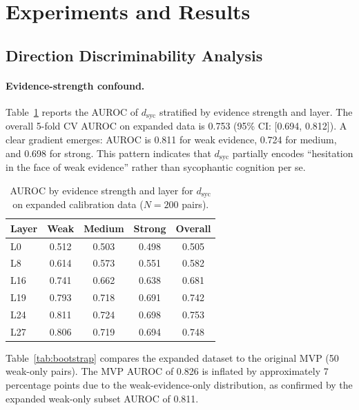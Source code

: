 \documentclass[11pt,a4paper]{article}
\begin{document}
\section{Experiments and Results}

\subsection{Direction Discriminability Analysis}
\label{sec:direction}

\paragraph{Evidence-strength confound.}
Table~\ref{tab:auroc_layer} reports the AUROC of $d_{\mathrm{syc}}$ stratified by evidence strength and layer. The overall 5-fold CV AUROC on expanded data is 0.753 (95\% CI: [0.694, 0.812]). A clear gradient emerges: AUROC is 0.811 for weak evidence, 0.724 for medium, and 0.698 for strong. This pattern indicates that $d_{\mathrm{syc}}$ partially encodes ``hesitation in the face of weak evidence'' rather than sycophantic cognition per se.

\begin{table}[h]
\centering
\caption{AUROC by evidence strength and layer for $d_{\mathrm{syc}}$ on expanded calibration data ($N = 200$ pairs).}
\label{tab:auroc_layer}
\small
\begin{tabular}{lcccc}
\toprule
Layer & Weak & Medium & Strong & Overall \\
\midrule
L0  & 0.512 & 0.503 & 0.498 & 0.505 \\
L8  & 0.614 & 0.573 & 0.551 & 0.582 \\
L16 & 0.741 & 0.662 & 0.638 & 0.681 \\
L19 & 0.793 & 0.718 & 0.691 & 0.742 \\
L24 & 0.811 & 0.724 & 0.698 & 0.753 \\
L27 & 0.806 & 0.719 & 0.694 & 0.748 \\
\bottomrule
\end{tabular}
\end{table}

Table~\ref{tab:bootstrap} compares the expanded dataset to the original MVP (50 weak-only pairs). The MVP AUROC of 0.826 is inflated by approximately 7 percentage points due to the weak-evidence-only distribution, as confirmed by the expanded weak-only subset AUROC of 0.811.
\end{document}

